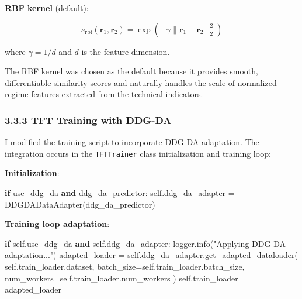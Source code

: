 \documentclass[
]{article}
\newenvironment{Shaded}{}{}
\newcommand{\ControlFlowTok}[1]{\textcolor[rgb]{0.00,0.44,0.13}{\textbf{#1}}}
\newcommand{\KeywordTok}[1]{\textcolor[rgb]{0.00,0.44,0.13}{\textbf{#1}}}
\newcommand{\NormalTok}[1]{#1}
\newcommand{\OperatorTok}[1]{\textcolor[rgb]{0.40,0.40,0.40}{#1}}
\newcommand{\StringTok}[1]{\textcolor[rgb]{0.25,0.44,0.63}{#1}}
\newcommand{\VariableTok}[1]{\textcolor[rgb]{0.10,0.09,0.49}{#1}}
\begin{document}
\textbf{RBF kernel} (default):

\[s_{\text{rbf}}(\mathbf{r}_1, \mathbf{r}_2) = \exp\left(-\gamma \|\mathbf{r}_1 - \mathbf{r}_2\|_2^2\right)\]

where $\gamma = 1/d$ and $d$ is the feature dimension.

The RBF kernel was chosen as the default because it provides smooth,
differentiable similarity scores and naturally handles the scale of
normalized regime features extracted from the technical indicators.

\subsubsection{3.3.3 TFT Training with
DDG-DA}\label{333-tft-training-with-ddg-da}

I modified the training script to incorporate DDG-DA adaptation. The
integration occurs in the \texttt{TFTTrainer} class initialization and
training loop:

\textbf{Initialization}:

\begin{Shaded}
\begin{Highlighting}[]
\ControlFlowTok{if}\NormalTok{ use\_ddg\_da }\KeywordTok{and}\NormalTok{ ddg\_da\_predictor:}
    \VariableTok{self}\NormalTok{.ddg\_da\_adapter }\OperatorTok{=}\NormalTok{ DDGDADataAdapter(ddg\_da\_predictor)}
\end{Highlighting}
\end{Shaded}

\textbf{Training loop adaptation}:

\begin{Shaded}
\begin{Highlighting}[]
\ControlFlowTok{if} \VariableTok{self}\NormalTok{.use\_ddg\_da }\KeywordTok{and} \VariableTok{self}\NormalTok{.ddg\_da\_adapter:}
\NormalTok{    logger.info(}\StringTok{"Applying DDG{-}DA adaptation..."}\NormalTok{)}
\NormalTok{    adapted\_loader }\OperatorTok{=} \VariableTok{self}\NormalTok{.ddg\_da\_adapter.get\_adapted\_dataloader(}
        \VariableTok{self}\NormalTok{.train\_loader.dataset,}
\NormalTok{        batch\_size}\OperatorTok{=}\VariableTok{self}\NormalTok{.train\_loader.batch\_size,}
\NormalTok{        num\_workers}\OperatorTok{=}\VariableTok{self}\NormalTok{.train\_loader.num\_workers}
\NormalTok{    )}
    \VariableTok{self}\NormalTok{.train\_loader }\OperatorTok{=}\NormalTok{ adapted\_loader}
\end{Highlighting}
\end{Shaded}
\end{document}
